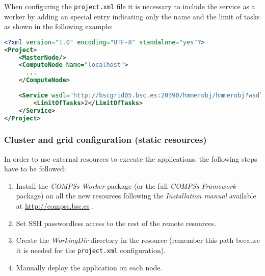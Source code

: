 When configuring the \texttt{project.xml} file it is necessary to include the service as a worker by adding an
special entry indicating only the name and the limit of tasks as shown in the following example:
\begin{lstlisting}[language=xml]
<?xml version="1.0" encoding="UTF-8" standalone="yes"?>                                                                                                                                                            
<Project>                                                                                                                                                                                                          
    <MasterNode/>                                                                                                                                                                                                  
    <ComputeNode Name="localhost">                                                                                                                                                                                 
      ...                                                                                                                                                                           
    </ComputeNode>   
    
    <Service wsdl="http://bscgrid05.bsc.es:20390/hmmerobj/hmmerobj?wsdl">                                                                                                                                          
        <LimitOfTasks>2</LimitOfTasks>                                                                                                                                                                             
    </Service>                                                                                                                                                                                                     
</Project> 
\end{lstlisting}

\subsubsection{Cluster and grid configuration (static resources)}
In order to use external resources to execute the applications, the following steps have to be followed:

\begin{enumerate}
 \item Install the \textit{COMPSs Worker} package (or the full \textit{COMPSs Framework} package) on all the new 
 resources following the \textit{Installation manual} available at \url{http://compss.bsc.es} .
 \item Set SSH passwordless access to the rest of the remote resources.
 \item Create the \textit{WorkingDir} directory in the resource (remember this path because it is needed 
 for the \texttt{project.xml} configuration).
 \item Manually deploy the application on each node.
\end{enumerate}

